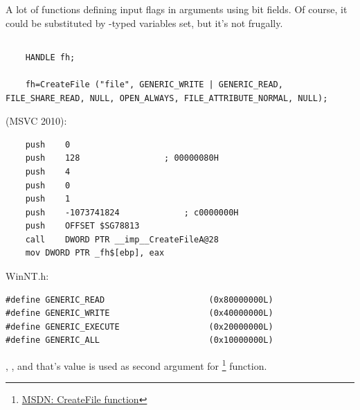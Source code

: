 ﻿\section{}
\label{sec:bitfields}

{A lot of functions defining input flags in arguments using bit fields.}
{Of course, it could be substituted by -typed variables set, but it's not frugally.}

\subsection{}


\begin{lstlisting}
	HANDLE fh;

	fh=CreateFile ("file", GENERIC_WRITE | GENERIC_READ, FILE_SHARE_READ, NULL, OPEN_ALWAYS, FILE_ATTRIBUTE_NORMAL, NULL);
\end{lstlisting}

 (MSVC 2010):

\begin{lstlisting}
	push	0
	push	128					; 00000080H
	push	4
	push	0
	push	1
	push	-1073741824				; c0000000H
	push	OFFSET $SG78813
	call	DWORD PTR __imp__CreateFileA@28
	mov	DWORD PTR _fh$[ebp], eax
\end{lstlisting}

 WinNT.h:

\begin{lstlisting}
#define GENERIC_READ                     (0x80000000L)
#define GENERIC_WRITE                    (0x40000000L)
#define GENERIC_EXECUTE                  (0x20000000L)
#define GENERIC_ALL                      (0x10000000L)
\end{lstlisting}

, 
, 
{and that's value is used as second argument for} \footnote{\href{http://msdn.microsoft.com/en-us/library/aa363858(VS.85).aspx}{MSDN: CreateFile function}} function.

